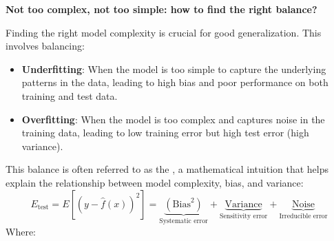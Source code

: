 \highspace
\begin{flushleft}
    \textcolor{Green3}{ \textbf{Not too complex, not too simple: how to find the right balance?}}
\end{flushleft}
Finding the right model complexity is crucial for good generalization. This involves balancing:
\begin{itemize}
    \item \textbf{Underfitting}: When the model is too simple to capture the underlying patterns in the data, leading to high bias and poor performance on both training and test data.
    \item \textbf{Overfitting}: When the model is too complex and captures noise in the training data, leading to low training error but high test error (high variance).
\end{itemize}
This balance is often referred to as the , a mathematical intuition that helps explain the relationship between model complexity, bias, and variance:
\begin{equation}
    E_{\text{test}} = E\left[\left(y - \hat{f}(x)\right)^{2}\right] =
    \underbrace{\left(\text{Bias}^{2}\right)}_{\text{Systematic error}} +
    \underbrace{\text{Variance}}_{\text{Sensitivity error}} +
    \underbrace{\text{Noise}}_{\text{Irreducible error}}
\end{equation}
Where:
